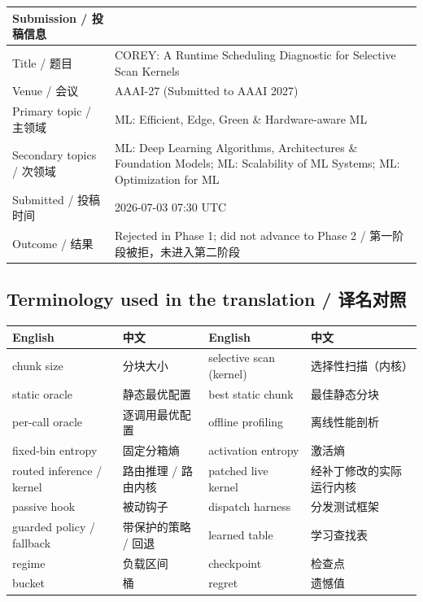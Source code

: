\documentclass[10pt,a4paper]{article}
\begin{document}
\begin{center}
\small
\begin{tabularx}{\textwidth}{@{}l X@{}}
\toprule
\textbf{Submission / 投稿信息} & \\
\midrule
Title / 题目 & COREY: A Runtime Scheduling Diagnostic for Selective Scan Kernels \\
Venue / 会议 & AAAI-27 (Submitted to AAAI 2027) \\
Primary topic / 主领域 & ML: Efficient, Edge, Green \& Hardware-aware ML \\
Secondary topics / 次领域 & ML: Deep Learning Algorithms, Architectures \& Foundation Models; ML: Scalability of ML Systems; ML: Optimization for ML \\
Submitted / 投稿时间 & 2026-07-03 07:30 UTC \\
Outcome / 结果 & Rejected in Phase 1; did not advance to Phase 2 / 第一阶段被拒，未进入第二阶段 \\
\bottomrule
\end{tabularx}
\end{center}

\subsection*{Terminology used in the translation / 译名对照}

\begin{center}
\small
\begin{tabularx}{\textwidth}{@{}l X l X@{}}
\toprule
\textbf{English} & \textbf{中文} & \textbf{English} & \textbf{中文} \\
\midrule
chunk size & 分块大小 & selective scan (kernel) & 选择性扫描（内核） \\
static oracle & 静态最优配置 & best static chunk & 最佳静态分块 \\
per-call oracle & 逐调用最优配置 & offline profiling & 离线性能剖析 \\
fixed-bin entropy & 固定分箱熵 & activation entropy & 激活熵 \\
routed inference / kernel & 路由推理 / 路由内核 & patched live kernel & 经补丁修改的实际运行内核 \\
passive hook & 被动钩子 & dispatch harness & 分发测试框架 \\
guarded policy / fallback & 带保护的策略 / 回退 & learned table & 学习查找表 \\
regime & 负载区间 & checkpoint & 检查点 \\
bucket & 桶 & regret & 遗憾值 \\
\bottomrule
\end{tabularx}
\end{center}
\end{document}
